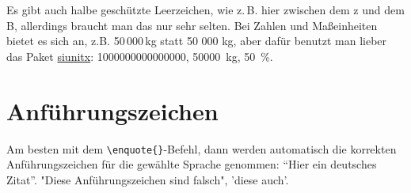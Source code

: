 Es gibt auch halbe geschützte Leerzeichen, wie z.\,B. hier zwischen dem z und dem B, allerdings braucht man das nur sehr selten. Bei Zahlen und Maßeinheiten bietet es sich an, z.B. 50\,000\,kg statt 50 000 kg, aber dafür benutzt man lieber das Paket \href{http://mirrors.ctan.org/macros/latex/contrib/siunitx/siunitx.pdf}{siunitx}: \num{1000000000000000}, \SI{50000}{\kg}, \SI{50}{\%}.

\section{Anführungszeichen}
Am besten mit dem \verb+\enquote{}+-Befehl, dann werden automatisch die korrekten Anführungszeichen für die gewählte Sprache genommen: \enquote{Hier ein deutsches Zitat}.
"Diese Anführungszeichen sind falsch", 'diese auch'.
